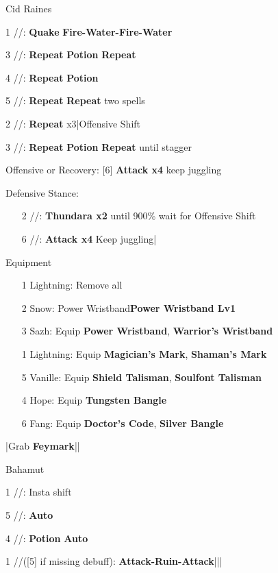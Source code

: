 \begin{fight}{Cid Raines}
	\item [1] \rav/\sen/\syn: \textbf{Quake} \to \textbf{Fire-Water-Fire-Water}
	\item [3] \rav/\sen/\rav: \textbf{Repeat} \to \textbf{Potion} \to \textbf{Repeat}
	\item [4] \rav/\sen/\rav: \textbf{Repeat} \to \textbf{Potion}
	\item [5] \rav/\rav/\syn: \textbf{Repeat} \to \textbf{Repeat} two spells
	\item [2] \rav/\rav/\rav: \textbf{Repeat} x3|Offensive Shift
	\item [3] \rav/\sen/\rav: \textbf{Repeat} \to \textbf{Potion} \to \textbf{Repeat} until stagger
	\item Offensive or Recovery: [6] \textbf{Attack x4} \to keep juggling
	\item Defensive Stance:
	\begin{itemize}
		\item [2] \rav/\rav/\rav: \textbf{Thundara x2} until 900\% \to wait for Offensive Shift
		\item [6] \com/\com/\rav: \textbf{Attack x4} \to Keep juggling|\skip
	\end{itemize}
\end{fight}
\begin{menu}
	\item Equipment
	\begin{itemize}
		\item [1] Lightning: Remove all
		\item [2] Snow: Power Wristband\star \to \textbf{Power Wristband Lv1}
		\item [3] Sazh: Equip \textbf{Power Wristband\star}, \textbf{Warrior's Wristband}
		\item [1] Lightning: Equip \textbf{Magician's Mark}, \textbf{Shaman's Mark}
		\item [5] Vanille: Equip \textbf{Shield Talisman}, \textbf{Soulfont Talisman}
		\item [4] Hope: Equip \textbf{Tungsten Bangle}
		\item [6] Fang: Equip \textbf{Doctor's Code}, \textbf{Silver Bangle}
	\end{itemize}
\end{menu}
\begin{mainlist}
	\item \skip|Grab \textbf{Feymark}|\skip|
\end{mainlist}
\begin{fight}{Bahamut}
	\item [1] \com/\rav/\rav: Insta shift
	\item [5] \sab/\com/\rav: \textbf{Auto}
	\item [4] \sen/\med/\med: \textbf{Potion} \to \textbf{Auto}
	\item [1] \com/\rav/\rav ([5] if missing debuff): \textbf{Attack-Ruin-Attack}|\skip||\save
\end{fight}
